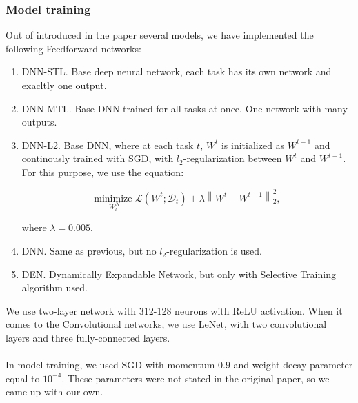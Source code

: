 \documentclass[12pt]{article}
\newcommand{\norm}[1]{\left\lVert#1\right\rVert}
\begin{document}
    \subsubsection{Model training}
    

    Out of introduced in the paper several models, we have implemented the following Feedforward networks:
    \begin{enumerate}  
        \item DNN-STL. Base deep neural network, each task has its own network and exacltly one output.
        \item DNN-MTL. Base DNN trained for all tasks at once. One network with many outputs.
        \item DNN-L2. Base DNN, where at each task $t$, $W^{t}$ is initialized as $W^{t-1}$ and continously
        trained with SGD, with $l_{2}$-regularization between $W^{t}$ and $W^{t-1}$. For this purpose, we use
        the equation:

        $$ \underset{W_{l}^{\mathcal{N}}}{\text{minimize }} \mathcal{L}(W^{t}; \mathcal{D}_{t}) + \lambda \norm{W^{t} - W^{t-1}}^{2}_{2}, $$

        where $\lambda = 0.005$.

        \item DNN. Same as previous, but no $l_{2}$-regularization is used.
        \item DEN. Dynamically Expandable Network, but only with Selective Training algorithm used.   
    \end{enumerate}
    \bigskip
    We use two-layer network with 312-128 neurons with ReLU activation.
    When it comes to the Convolutional networks, we use LeNet, with two convolutional layers
    and three fully-connected layers.
    \\
    \\
    In model training, we used SGD with momentum $0.9$ and weight decay parameter equal to $10^{-4}$.
    These parameters were not stated in the original paper, so we came up with our own.
    
    
\end{document}
